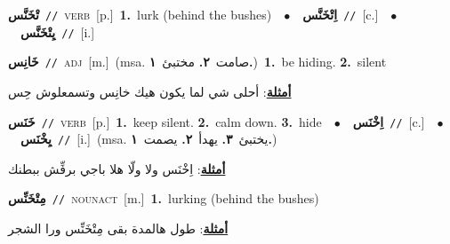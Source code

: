 \documentclass[10pt,a4paper,twoside]{article} %
\begin{document}
\begin{multicols}{2}
{\setlength\topsep{0pt}\textbf{\foreignlanguage{arabic}{تْخَنَّس}}\ {\color{gray}\texttt{//}\color{black}}\ \textsc{verb}\ [p.]\ \textbf{1.}~lurk (behind the bushes)\ \ $\bullet$\ \ \setlength\topsep{0pt}\textbf{\foreignlanguage{arabic}{اِتْخَنَّس}}\ {\color{gray}\texttt{//}\color{black}}\ [c.]\ \ $\bullet$\ \ \setlength\topsep{0pt}\textbf{\foreignlanguage{arabic}{يِتْخَنَّس}}\ {\color{gray}\texttt{//}\color{black}}\ [i.]\ } \vspace{2mm}

{\setlength\topsep{0pt}\textbf{\foreignlanguage{arabic}{خَانِس}}\ {\color{gray}\texttt{//}\color{black}}\ \textsc{adj}\ [m.]\ \color{gray}(msa. \foreignlanguage{arabic}{صامت}~\foreignlanguage{arabic}{\textbf{٢.}}  \foreignlanguage{arabic}{مختبئ}~\foreignlanguage{arabic}{\textbf{١.}})\color{black}\ \textbf{1.}~be hiding.  \textbf{2.}~silent\  \begin{flushright}\color{gray}\foreignlanguage{arabic}{\textbf{\underline{\foreignlanguage{arabic}{أمثلة}}}: أحلى شي لما يكون هيك خانِس  وتسمعلوش حِس}\end{flushright}\color{black}} \vspace{2mm}

{\setlength\topsep{0pt}\textbf{\foreignlanguage{arabic}{خَنَس}}\ {\color{gray}\texttt{//}\color{black}}\ \textsc{verb}\ [p.]\ \textbf{1.}~keep silent.  \textbf{2.}~calm down.  \textbf{3.}~hide\ \ $\bullet$\ \ \setlength\topsep{0pt}\textbf{\foreignlanguage{arabic}{اِخْنَس}}\ {\color{gray}\texttt{//}\color{black}}\ [c.]\ \ $\bullet$\ \ \setlength\topsep{0pt}\textbf{\foreignlanguage{arabic}{يِخْنَس}}\ {\color{gray}\texttt{//}\color{black}}\ [i.]\ \color{gray}(msa. \foreignlanguage{arabic}{يختبئ}~\foreignlanguage{arabic}{\textbf{٣.}}  \foreignlanguage{arabic}{يهدأ}~\foreignlanguage{arabic}{\textbf{٢.}}  \foreignlanguage{arabic}{يصمت}~\foreignlanguage{arabic}{\textbf{١.}})\color{black}\  \begin{flushright}\color{gray}\foreignlanguage{arabic}{\textbf{\underline{\foreignlanguage{arabic}{أمثلة}}}: اِخْنَس ولا ولّا هلا باجي برفِّش ببطنك}\end{flushright}\color{black}} \vspace{2mm}

{\setlength\topsep{0pt}\textbf{\foreignlanguage{arabic}{مِتْخَنِّس}}\ {\color{gray}\texttt{//}\color{black}}\ \textsc{noun\textunderscore act}\ [m.]\ \textbf{1.}~lurking (behind the bushes)\  \begin{flushright}\color{gray}\foreignlanguage{arabic}{\textbf{\underline{\foreignlanguage{arabic}{أمثلة}}}: طول هالمدة بقى مِتْخَنِّس ورا الشجر}\end{flushright}\color{black}} \vspace{2mm}


\end{multicols}
\end{document}
